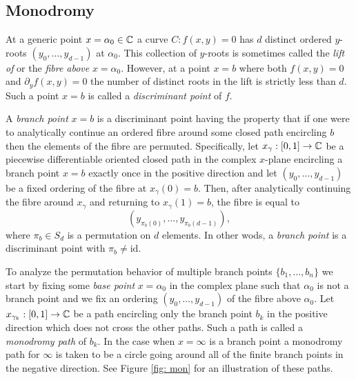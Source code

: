 \subsection{Monodromy}\label{subsec:background-monodromy}

At a generic point $x = \alpha_0 \in \operatorname{\mathbb{C}}$ a curve $C : f(x,y) = 0$ has $d$
distinct ordered $y$-roots $(y_0,\ldots,y_{d-1})$ at $\alpha_0$. This collection
of $y$-roots is sometimes called the {\it lift of} or the {\it fibre above}
$x=\alpha_0$. However, at a point $x=b$ where both $f(x,y) = 0$ and $\partial_y
f(x,y) = 0$ the number of distinct roots in the lift is strictly less than $d$.
Such a point $x = b$ is called a {\it discriminant point} of $f$.

A {\it branch point} $x=b$ is a discriminant point having the property that if
one were to analytically continue an ordered fibre around some closed path
encircling $b$ then the elements of the fibre are permuted. Specifically, let
$x_{\gamma} : [0,1] \to \operatorname{\mathbb{C}}$ be a piecewise differentiable oriented closed path
in the complex $x$-plane encircling a branch point $x=b$ exactly once in the
positive direction and let $(y_0,\ldots,y_{d-1})$ be a fixed ordering of the
fibre at $x_\gamma(0) = b$. Then, after analytically continuing the fibre around
$x_\gamma$ and returning to $x_\gamma(1) = b$, the fibre is equal to
\[
    (y_{\pi_b(0)}, \ldots, y_{\pi_b(d-1)}),
\]
where $\pi_b \in S_d$ is a permutation on $d$ elements. In other wods, a
{\it branch point} is a discriminant point with $\pi_b \neq \text{id}$.

To analyze the permutation behavior of multiple branch points
$\{b_1,\ldots,b_n\}$ we start by fixing some {\it base point} $x=\alpha_0$ in
the complex plane such that $\alpha_0$ is not a branch point and we fix an
ordering $(y_0,\ldots,y_{d-1})$ of the fibre above $\alpha_0$. Let $x_{\gamma_k}
: [0,1] \to \operatorname{\mathbb{C}}$ be a path encircling only the branch point $b_k$ in the
positive direction which does not cross the other paths. Such a path is called a
{\it monodromy path} of $b_k$. In the case when $x = \infty$ is a branch point a
monodromy path for $\infty$ is taken to be a circle going around all of the
finite branch points in the negative direction. See Figure \ref{fig: mon} for an
illustration of these paths.

